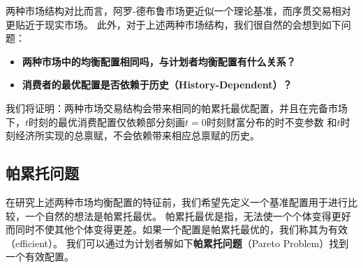 两种市场结构对比而言，阿罗-德布鲁市场更近似一个理论基准，而序贯交易相对更贴近于现实市场。
此外，对于上述两种市场结构，我们很自然的会想到如下问题：
\begin{itemize}
    \item \textbf{两种市场中的均衡配置相同吗，与计划者均衡配置有什么关系？}
    \item \textbf{消费者的最优配置是否依赖于历史（History-Dependent）？}
\end{itemize}

我们将证明：两种市场交易结构会带来相同的帕累托最优配置，并且在完备市场下，$t$时刻的最优消费配置仅依赖部分刻画$t=0$时刻财富分布的时不变参数
和$t$时刻经济所实现的总禀赋，不会依赖带来相应总禀赋的历史。


\subsection{帕累托问题}

在研究上述两种市场均衡配置的特征前，我们希望先定义一个基准配置用于进行比较，一个自然的想法是帕累托最优。
帕累托最优是指，无法使一个个体变得更好而同时不使其他个体变得更差。如果一个配置是帕累托最优的，我们称其为有效（efficient）。
我们可以通过为计划者解如下\textbf{帕累托问题}（Pareto Problem）找到一个有效配置。

